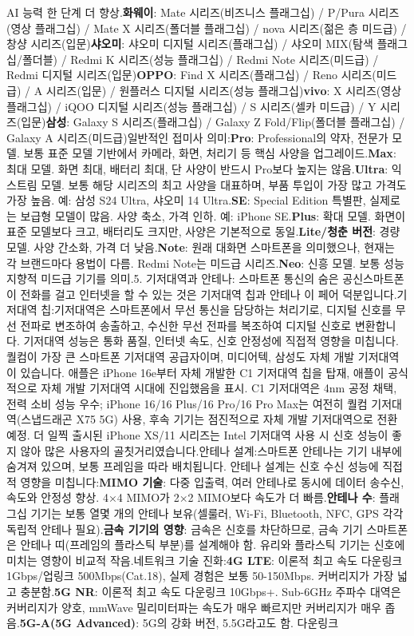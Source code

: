 AI 능력 한 단계 더 향상.\textbf{화웨이}: Mate 시리즈(비즈니스 플래그십) / P/Pura 시리즈(영상 플래그십) / Mate X 시리즈(폴더블 플래그십) / nova 시리즈(젊은 층 미드급) / 창샹 시리즈(입문)\textbf{샤오미}: 샤오미 디지털 시리즈(플래그십) / 샤오미 MIX(탐색 플래그십/폴더블) / Redmi K 시리즈(성능 플래그십) / Redmi Note 시리즈(미드급) / Redmi 디지털 시리즈(입문)\textbf{OPPO}: Find X 시리즈(플래그십) / Reno 시리즈(미드급) / A 시리즈(입문) / 원플러스 디지털 시리즈(성능 플래그십)\textbf{vivo}: X 시리즈(영상 플래그십) / iQOO 디지털 시리즈(성능 플래그십) / S 시리즈(셀카 미드급) / Y 시리즈(입문)\textbf{삼성}: Galaxy S 시리즈(플래그십) / Galaxy Z Fold/Flip(폴더블 플래그십) / Galaxy A 시리즈(미드급)일반적인 접미사 의미:\textbf{Pro}: Professional의 약자, 전문가 모델. 보통 표준 모델 기반에서 카메라, 화면, 처리기 등 핵심 사양을 업그레이드.\textbf{Max}: 최대 모델. 화면 최대, 배터리 최대, 단 사양이 반드시 Pro보다 높지는 않음.\textbf{Ultra}: 익스트림 모델. 보통 해당 시리즈의 최고 사양을 대표하며, 부품 투입이 가장 많고 가격도 가장 높음. 예: 삼성 S24 Ultra, 샤오미 14 Ultra.\textbf{SE}: Special Edition 특별판, 실제로는 보급형 모델이 많음. 사양 축소, 가격 인하. 예: iPhone SE.\textbf{Plus}: 확대 모델. 화면이 표준 모델보다 크고, 배터리도 크지만, 사양은 기본적으로 동일.\textbf{Lite/청춘 버전}: 경량 모델. 사양 간소화, 가격 더 낮음.\textbf{Note}: 원래 대화면 스마트폰을 의미했으나, 현재는 각 브랜드마다 용법이 다름. Redmi Note는 미드급 시리즈.\textbf{Neo}: 신흥 모델. 보통 성능 지향적 미드급 기기를 의미.5. 기저대역과 안테나: 스마트폰 통신의 숨은 공신스마트폰이 전화를 걸고 인터넷을 할 수 있는 것은 기저대역 칩과 안테나 이 페어 덕분입니다.기저대역 칩:기저대역은 스마트폰에서 무선 통신을 담당하는 처리기로, 디지털 신호를 무선 전파로 변조하여 송출하고, 수신한 무선 전파를 복조하여 디지털 신호로 변환합니다. 기저대역 성능은 통화 품질, 인터넷 속도, 신호 안정성에 직접적 영향을 미칩니다. 퀄컴이 가장 큰 스마트폰 기저대역 공급자이며, 미디어텍, 삼성도 자체 개발 기저대역이 있습니다. 애플은 iPhone 16e부터 자체 개발한 C1 기저대역 칩을 탑재, 애플이 공식적으로 자체 개발 기저대역 시대에 진입했음을 표시. C1 기저대역은 4nm 공정 채택, 전력 소비 성능 우수; iPhone 16/16 Plus/16 Pro/16 Pro Max는 여전히 퀄컴 기저대역(스냅드래곤 X75 5G) 사용, 후속 기기는 점진적으로 자체 개발 기저대역으로 전환 예정. 더 일찍 출시된 iPhone XS/11 시리즈는 Intel 기저대역 사용 시 신호 성능이 좋지 않아 많은 사용자의 골칫거리였습니다.안테나 설계:스마트폰 안테나는 기기 내부에 숨겨져 있으며, 보통 프레임을 따라 배치됩니다. 안테나 설계는 신호 수신 성능에 직접적 영향을 미칩니다:\textbf{MIMO 기술}: 다중 입출력, 여러 안테나로 동시에 데이터 송수신, 속도와 안정성 향상. 4×4 MIMO가 2×2 MIMO보다 속도가 더 빠름.\textbf{안테나 수}: 플래그십 기기는 보통 열몇 개의 안테나 보유(셀룰러, Wi-Fi, Bluetooth, NFC, GPS 각각 독립적 안테나 필요).\textbf{금속 기기의 영향}: 금속은 신호를 차단하므로, 금속 기기 스마트폰은 안테나 띠(프레임의 플라스틱 부분)를 설계해야 함. 유리와 플라스틱 기기는 신호에 미치는 영향이 비교적 작음.네트워크 기술 진화:\textbf{4G LTE}: 이론적 최고 속도 다운링크 1Gbps/업링크 500Mbps(Cat.18), 실제 경험은 보통 50-150Mbps. 커버리지가 가장 넓고 충분함.\textbf{5G NR}: 이론적 최고 속도 다운링크 10Gbps+. Sub-6GHz 주파수 대역은 커버리지가 양호, mmWave 밀리미터파는 속도가 매우 빠르지만 커버리지가 매우 좁음.\textbf{5G-A(5G Advanced)}: 5G의 강화 버전, 5.5G라고도 함. 다운링크 